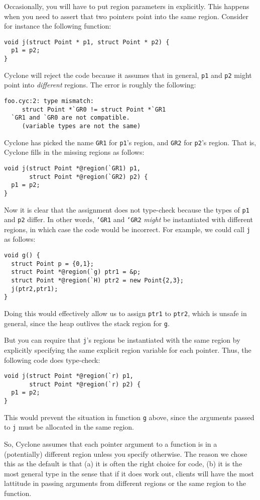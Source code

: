 Occasionally, you will have to put region parameters in explicitly.
This happens when you need to assert that two pointers point into 
the same region.  Consider for instance the following function:
\begin{verbatim}
void j(struct Point * p1, struct Point * p2) {
  p1 = p2;
}
\end{verbatim}
Cyclone will reject the code because it assumes that in general,
\texttt{p1} and \texttt{p2} might point into \emph{different}
regions.  The error is roughly the following:
\begin{verbatim}
foo.cyc:2: type mismatch:
     struct Point *`GR0 != struct Point *`GR1
  `GR1 and `GR0 are not compatible. 
     (variable types are not the same)
\end{verbatim}
Cyclone has picked the name \texttt{GR1} for \texttt{p1}'s region, and
\texttt{GR2} for \texttt{p2}'s region.  That is, Cyclone fills in the
missing regions as follows:
\begin{verbatim}
void j(struct Point *@region(`GR1) p1, 
       struct Point *@region(`GR2) p2) {
  p1 = p2;
}
\end{verbatim}
Now it is clear that the assignment does not type-check because
the types of \texttt{p1} and \texttt{p2} differ.  In other words,
\texttt{`GR1} and \texttt{`GR2} \emph{might} be instantiated with
different regions, in which case the code would be incorrect.  For
example, we could call \texttt{j} as follows:
\begin{verbatim}
void g() {
  struct Point p = {0,1};
  struct Point *@region(`g) ptr1 = &p;
  struct Point *@region(`H) ptr2 = new Point{2,3};
  j(ptr2,ptr1);
}
\end{verbatim}
Doing this would effectively allow us to assign \texttt{ptr1} to
\texttt{ptr2}, which is unsafe in general, since the heap outlives the
stack region for \texttt{g}.  

But you can require that \texttt{j}'s regions be instantiated with the
same region by explicitly specifying the same explicit region variable
for each pointer.  Thus, the following code does type-check:
\begin{verbatim}
void j(struct Point *@region(`r) p1, 
       struct Point *@region(`r) p2) {
  p1 = p2;
}
\end{verbatim}
This would prevent the situation in function \texttt{g} above, since
the arguments passed to \texttt{j} must be allocated in the same
region.

So, Cyclone assumes that each pointer argument to a function is
in a (potentially) different region unless you specify otherwise.
The reason we chose this as the default is that (a) it is often
the right choice for code, (b) it is the most general type in
the sense that if it does work out, clients will have the most
lattitude in passing arguments from different regions or the
same region to the function.  

